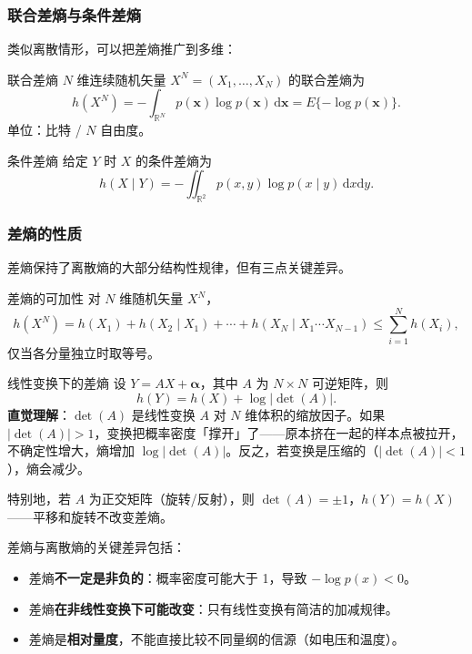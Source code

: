 \subsubsection{联合差熵与条件差熵}

类似离散情形，可以把差熵推广到多维：

\begin{definitionBox}{联合差熵}
$N$ 维连续随机矢量 $X^N=(X_1,\dots,X_N)$ 的联合差熵为
\[
h(X^N)=-\int_{\mathbb{R}^N} p(\bm{x})\log p(\bm{x})\,\mathrm{d}\bm{x}
      =E\{-\log p(\bm{x})\}.
\]
单位：比特 / $N$ 自由度。
\end{definitionBox}

\begin{definitionBox}{条件差熵}
给定 $Y$ 时 $X$ 的条件差熵为
\[
h(X\mid Y)=-\iint_{\mathbb{R}^2} p(x,y)\log p(x\mid y)\,\mathrm{d}x\mathrm{d}y.
\]
\end{definitionBox}

\subsubsection{差熵的性质}

差熵保持了离散熵的大部分结构性规律，但有三点关键差异。

\begin{formulaBox}{差熵的可加性}
对 $N$ 维随机矢量 $X^N$，
\[
h(X^N)=h(X_1)+h(X_2\mid X_1)+\cdots+h(X_N\mid X_1\cdots X_{N-1})
      \le \sum_{i=1}^N h(X_i),
\]
仅当各分量独立时取等号。
\end{formulaBox}

\begin{formulaBox}{线性变换下的差熵}
设 $Y=AX+\bm{\alpha}$，其中 $A$ 为 $N\times N$ 可逆矩阵，则
\[
h(Y)=h(X)+\log|\det(A)|.
\]
\textbf{直觉理解}：$\det(A)$ 是线性变换 $A$ 对 $N$ 维体积的缩放因子。如果 $|\det(A)|>1$，变换把概率密度「撑开」了——原本挤在一起的样本点被拉开，不确定性增大，熵增加 $\log|\det(A)|$。反之，若变换是压缩的（$|\det(A)|<1$），熵会减少。

特别地，若 $A$ 为正交矩阵（旋转/反射），则 $\det(A)=\pm1$，$h(Y)=h(X)$——平移和旋转不改变差熵。
\end{formulaBox}

差熵与离散熵的关键差异包括：
\begin{itemize}
  \item 差熵\textbf{不一定是非负的}：概率密度可能大于 1，导致 $-\log p(x)<0$。
  \item 差熵\textbf{在非线性变换下可能改变}：只有线性变换有简洁的加减规律。
  \item 差熵是\textbf{相对量度}，不能直接比较不同量纲的信源（如电压和温度）。
\end{itemize}

